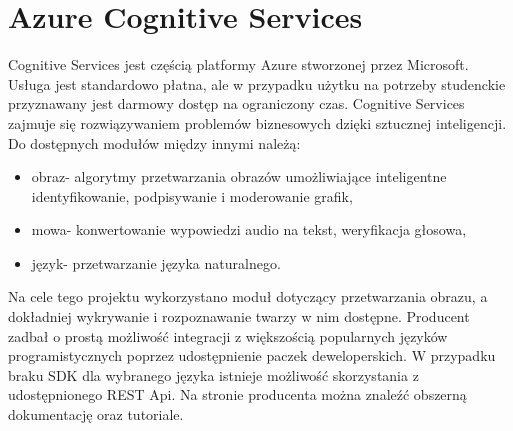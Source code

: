 \section{Azure Cognitive Services}
Cognitive Services jest częścią platformy Azure stworzonej przez Microsoft. Usługa jest standardowo płatna, ale w przypadku użytku na potrzeby studenckie przyznawany jest darmowy dostęp na ograniczony czas. Cognitive Services zajmuje się rozwiązywaniem problemów biznesowych dzięki sztucznej inteligencji. Do dostępnych modułów między innymi należą:
\begin{itemize}
\item obraz- algorytmy przetwarzania obrazów umożliwiające inteligentne identyfikowanie, podpisywanie i moderowanie grafik,
\item mowa- konwertowanie wypowiedzi audio na tekst, weryfikacja głosowa,
\item język- przetwarzanie języka naturalnego.
\end{itemize}
Na cele tego projektu wykorzystano moduł dotyczący przetwarzania obrazu, a dokładniej wykrywanie i rozpoznawanie twarzy w nim dostępne. Producent zadbał o prostą możliwość integracji z większością popularnych języków programistycznych poprzez udostępnienie paczek deweloperskich. W przypadku braku SDK dla wybranego języka istnieje możliwość skorzystania z udostępnionego REST Api. Na stronie producenta można znaleźć obszerną dokumentację oraz tutoriale.
